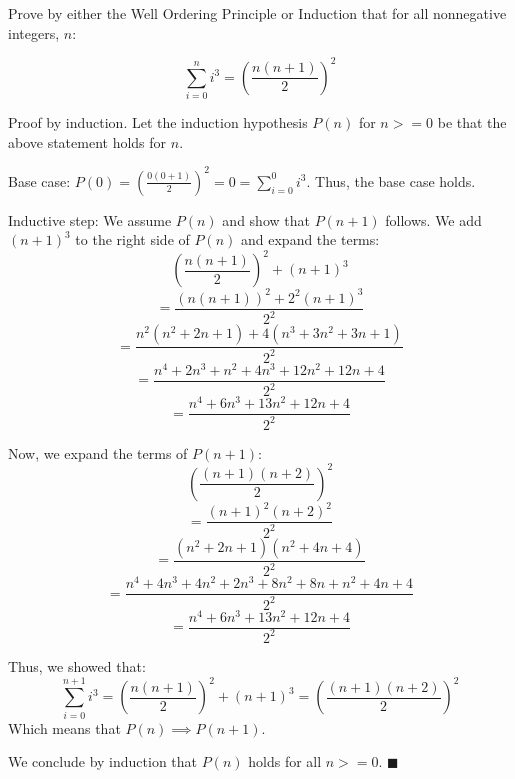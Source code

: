\documentclass[../main.tex]{subfiles}
\begin{document}
\begin{questions}

\question Prove by either the Well Ordering Principle or Induction that for all nonnegative integers, $n$:

$$
\sum_{i=0}^{n} i^3 = \left(\frac{n(n+1)}{2}\right)^2
$$

\begin{solution}

  Proof by induction. Let the induction hypothesis $P(n)$ for $n >= 0$ be that the above statement holds for $n$.

  Base case: $P(0) = \left(\frac{0(0+1)}{2}\right)^2 = 0 = \sum_{i=0}^{0} i^3$. Thus, the base case holds.
  
  Inductive step: We assume $P(n)$ and show that $P(n+1)$ follows. We add $(n+1)^3$ to the right side of $P(n)$ and expand the terms:
  $$
  \left(\frac{n(n+1)}{2}\right)^2 + (n+1)^3
  $$
  $$
  = \frac{(n(n+1))^2 + 2^2(n+1)^3}{2^2}
  $$
  $$
  = \frac{n^2(n^2+2n+1) + 4(n^3+3n^2+3n+1)}{2^2}
  $$
  $$
  = \frac{n^4+2n^3+n^2+4n^3+12n^2+12n+4}{2^2}
  $$
  $$
  = \frac{n^4+6n^3+13n^2+12n+4}{2^2}
  $$

  Now, we expand the terms of $P(n+1)$:
  $$
  \left(\frac{(n+1)(n+2)}{2}\right)^2
  $$
  $$
  = \frac{(n+1)^2(n+2)^2}{2^2}
  $$
  $$
  = \frac{(n^2+2n+1)(n^2+4n+4)}{2^2}
  $$
  $$
  = \frac{n^4+4n^3+4n^2+2n^3+8n^2+8n+n^2+4n+4}{2^2}
  $$
  $$
  = \frac{n^4+6n^3+13n^2+12n+4}{2^2}
  $$

  Thus, we showed that:
  $$
  \sum_{i=0}^{n+1} i^3 = \left(\frac{n(n+1)}{2}\right)^2 + (n+1)^3 = \left(\frac{(n+1)(n+2)}{2}\right)^2
  $$
  Which means that $P(n) \implies P(n+1)$.

  We conclude by induction that $P(n)$ holds for all $n >= 0$. $\blacksquare$
\end{solution}

\end{questions}
\end{document}
